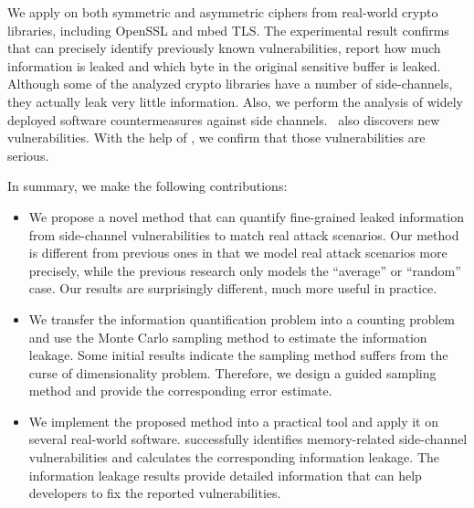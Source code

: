 We apply \tool{} on both symmetric and asymmetric ciphers from real-world crypto
libraries, including OpenSSL and mbed TLS\@. The experimental result confirms
that \tool{} can precisely identify previously known vulnerabilities, report
how much information is leaked and which byte in the original sensitive buffer
is leaked. Although some of the analyzed crypto libraries have a number of
side-channels, they actually leak very little information. Also, we perform the
analysis of widely deployed software countermeasures against side channels.
\tool\ also discovers new vulnerabilities. With the help of \tool{}, we confirm
that those vulnerabilities are serious.

In summary, we make the following contributions:

\begin{itemize}
      \item We propose a novel method that can quantify fine-grained leaked
            information from side-channel vulnerabilities to match real attack
            scenarios.  Our method is different from previous ones in that we
            model real attack scenarios more precisely, while the previous
            research only models the ``average'' or ``random'' case. Our results
            are surprisingly different,
            much more useful in practice.

      \item We transfer the information quantification problem into a counting
            problem and use the Monte Carlo sampling method to estimate the
            information leakage. Some initial results indicate the sampling
            method suffers from the curse of dimensionality problem. Therefore, we
            design a guided sampling method and provide the
            corresponding error estimate.

      \item We implement the proposed method into a practical tool and apply it
            on several real-world software. \tool{} successfully identifies
            memory-related side-channel vulnerabilities and calculates the
            corresponding information leakage. The information leakage results
            provide detailed information that can help developers to fix the
            reported vulnerabilities.
\end{itemize}
